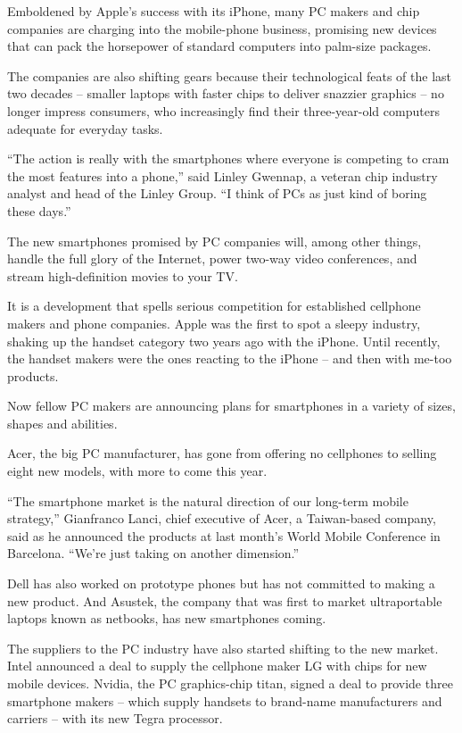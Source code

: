 \documentclass[12pt,a4paper,onecolumn]{article}
\begin{document}
\begin{CJK*}{GBK}{song}
Emboldened by Apple's success with its iPhone, many PC makers and chip companies are charging into
the mobile-phone business, promising new devices that can pack the horsepower of standard computers
into palm-size packages.

The companies are also shifting gears because their technological feats of the last two decades --
smaller laptops with faster chips to deliver snazzier graphics -- no longer impress consumers, who
increasingly find their three-year-old computers adequate for everyday tasks.

``The action is really with the smartphones where everyone is competing to cram the most features
into a phone,'' said Linley Gwennap, a veteran chip industry analyst and head of the Linley Group.
``I think of PCs as just kind of boring these days.''

The new smartphones promised by PC companies will, among other things, handle the full glory of the
Internet, power two-way video conferences, and stream high-definition movies to your TV.

It is a development that spells serious competition for established cellphone makers and phone
companies. Apple was the first to spot a sleepy industry, shaking up the handset category two years
ago with the iPhone. Until recently, the handset makers were the ones reacting to the iPhone -- and
then with me-too products.

Now fellow PC makers are announcing plans for smartphones in a variety of sizes, shapes and
abilities.

Acer, the big PC manufacturer, has gone from offering no cellphones to selling eight new models,
with more to come this year.

``The smartphone market is the natural direction of our long-term mobile strategy,'' Gianfranco
Lanci, chief executive of Acer, a Taiwan-based company, said as he announced the products at last
month's World Mobile Conference in Barcelona. ``We're just taking on another dimension.''

Dell has also worked on prototype phones but has not committed to making a new product. And Asustek,
the company that was first to market ultraportable laptops known as netbooks, has new smartphones
coming.

The suppliers to the PC industry have also started shifting to the new market. Intel announced a
deal to supply the cellphone maker LG with chips for new mobile devices. Nvidia, the PC
graphics-chip titan, signed a deal to provide three smartphone makers -- which supply handsets to
brand-name manufacturers and carriers -- with its new Tegra processor.


\end{CJK*}
\end{document}
